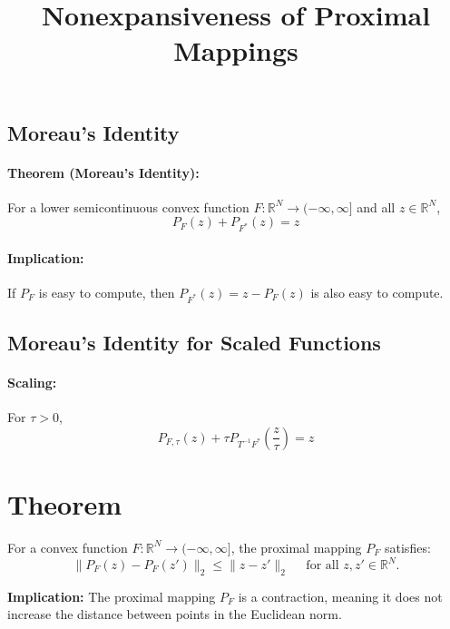 \documentclass{article}
\begin{document}
\subsection*{Moreau's Identity}

\paragraph{Theorem (Moreau's Identity):}
For a lower semicontinuous convex function $F : \mathbb{R}^N \rightarrow (-\infty,\infty]$ and all $z \in \mathbb{R}^N$,
\[
P_F(z) + P_{F^*}(z) = z
\]

\paragraph{Implication:}
If $P_F$ is easy to compute, then $P_{F^*}(z) = z - P_F(z)$ is also easy to compute.

\subsection*{Moreau's Identity for Scaled Functions}

\paragraph{Scaling:}
For $\tau > 0$,
\[
P_{F, \tau}(z) + \tau P_{T^{-1}F^*} \left( \frac{z}{\tau} \right) = z
\]













\title{Nonexpansiveness of Proximal Mappings}
\author{}
\date{}



\maketitle

\section*{Theorem}
For a convex function $F : \mathbb{R}^N \rightarrow (-\infty, \infty]$, the proximal mapping $P_F$ satisfies: 
\[
\|P_F(z) - P_F(z')\|_2 \leq \|z - z'\|_2 \quad \text{ for all } z, z' \in \mathbb{R}^N.
\]

\textbf{Implication:} The proximal mapping $P_F$ is a contraction, meaning it does not increase the distance between points in the Euclidean norm.
\end{document}
